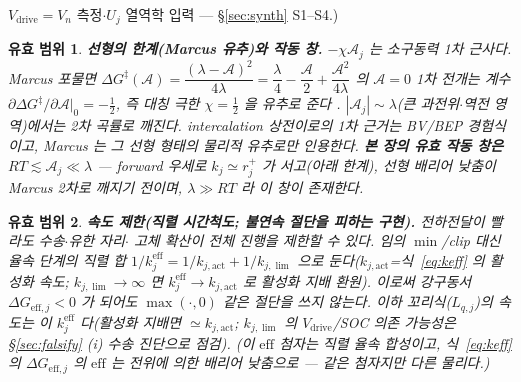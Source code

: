 \documentclass[11pt,a4paper]{article}
\newtheorem*{boundbox}{유효 범위}
\newcommand{\eff}{\mathrm{eff}}
\newcommand{\drive}{\mathrm{drive}}
\begin{document}
$V_\drive=V_n$ 측정$\cdot$$U_j$ 열역학 입력 — \S\ref{sec:synth} S1–S4.)
\begin{boundbox}
\textbf{선형의 한계(Marcus 유추)와 작동 창.} $-\chi\mathcal A_j$ 는 \emph{소구동력 1차} 근사다. Marcus 포물면
$\Delta G^\ddagger(\mathcal A)=\dfrac{(\lambda-\mathcal A)^2}{4\lambda}=\dfrac{\lambda}{4}-\dfrac{\mathcal A}{2}
+\dfrac{\mathcal A^2}{4\lambda}$ 의 $\mathcal A=0$ 1차 전개는 계수 $\partial\Delta G^\ddagger/\partial\mathcal A|_0
=-\tfrac12$, 즉 대칭 극한 $\chi=\tfrac12$ 을 \emph{유추}로 준다 \cite{marcus1956}. $|\mathcal A_j|\sim\lambda$(큰
과전위$\cdot$역전 영역)에서는 2차 곡률로 깨진다. \emph{intercalation 상전이로의 1차 근거는 BV/BEP 경험식이고,
Marcus 는 그 선형 형태의 물리적 유추로만 인용한다.} \textbf{본 장의 유효 작동 창은 $RT\lesssim\mathcal A_j\ll\lambda$}
— forward 우세로 $k_j\simeq r_j^+$ 가 서고(아래 한계), 선형 배리어 낮춤이 Marcus 2차로 깨지기 전이며,
$\lambda\gg RT$ 라 이 창이 존재한다.
\end{boundbox}
\begin{boundbox}
\textbf{속도 제한(직렬 시간척도; 불연속 절단을 피하는 구현).} 전하전달이 빨라도 수송$\cdot$유한 자리$\cdot$
고체 확산이 전체 진행을 제한할 수 있다. 임의 $\min$/clip 대신 율속 단계의 직렬 합 $1/k_j^{\eff}=1/k_{j,\mathrm{act}}+1/k_{j,\lim}$
으로 둔다($k_{j,\mathrm{act}}$=식~\eqref{eq:keff} 의 활성화 속도; $k_{j,\lim}\to\infty$ 면 $k_j^{\eff}\to k_{j,\mathrm{act}}$ 로 활성화
지배 환원). 이로써 강구동서 $\Delta G_{\eff,j}<0$ 가 되어도 $\max(\cdot,0)$ 같은 절단을 쓰지 않는다. 이하 꼬리식($L_{q,j}$)의
속도는 이 $k_j^{\eff}$ 다(활성화 지배면 $\simeq k_{j,\mathrm{act}}$; $k_{j,\lim}$ 의 $V_\drive$/SOC 의존 가능성은 \S\ref{sec:falsify}
(i) 수송 진단으로 점검). (이 $\eff$ 첨자는 \emph{직렬 율속}
합성이고, 식~\eqref{eq:keff} 의 $\Delta G_{\eff,j}$ 의 $\eff$ 는 \emph{전위에 의한 배리어 낮춤}으로 — 같은 첨자지만 다른
물리다.)
\end{boundbox}
\end{document}
